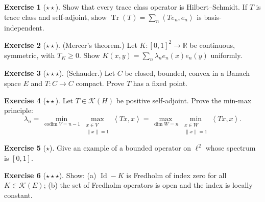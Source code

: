 \documentclass[a4paper,12pt]{book}
\DeclareMathOperator{\Id}{Id}
\DeclareMathOperator{\Tr}{Tr}
\DeclareMathOperator{\codim}{codim}
\newcommand{\R}{\mathbb{R}}
\newcommand{\norm}[1]{\left\| #1 \right\|}
\newcommand{\inner}[2]{\left\langle #1, #2 \right\rangle}
\theoremstyle{definition}
\newtheorem{exercise}{Exercise}[chapter]
\theoremstyle{plain}
\theoremstyle{remark}
\begin{document}
\begin{exercise}[$\star\star$]\label{exo:trace-class}
Show that every trace class operator is Hilbert--Schmidt. If $T$ is trace class
and self-adjoint, show $\Tr(T) = \sum_n \inner{Te_n}{e_n}$ is basis-independent.
\end{exercise}

\begin{exercise}[$\star\star$]\label{exo:mercer}
(Mercer's theorem.) Let $K \colon [0,1]^2 \to \R$ be continuous, symmetric, with
$T_K \ge 0$. Show $K(x,y) = \sum_n \lambda_n e_n(x) e_n(y)$ uniformly.
\end{exercise}

\begin{exercise}[$\star\star\star$]\label{exo:schauder-fixed-pt}
(Schauder.) Let $C$ be closed, bounded, convex in a Banach space $E$ and
$T \colon C \to C$ compact. Prove $T$ has a fixed point.
\end{exercise}

\begin{exercise}[$\star\star$]\label{exo:eigenvalue-variational}
Let $T \in \mathcal{K}(H)$ be positive self-adjoint. Prove the min-max principle:
\[
  \lambda_n = \min_{\codim V = n-1} \max_{\substack{x \in V \\ \norm{x}=1}}
  \inner{Tx}{x}
  = \max_{\dim W = n} \min_{\substack{x \in W \\ \norm{x}=1}} \inner{Tx}{x}.
\]
\end{exercise}

\begin{exercise}[$\star$]\label{exo:compact-spectrum-example}
Give an example of a bounded operator on $\ell^2$ whose spectrum is $[0,1]$.
\end{exercise}

\begin{exercise}[$\star\star\star$]\label{exo:fredholm-index}
Show: (a) $\Id - K$ is Fredholm of index zero for all $K \in \mathcal{K}(E)$;
(b) the set of Fredholm operators is open and the index is locally constant.
\end{exercise}


\end{document}
